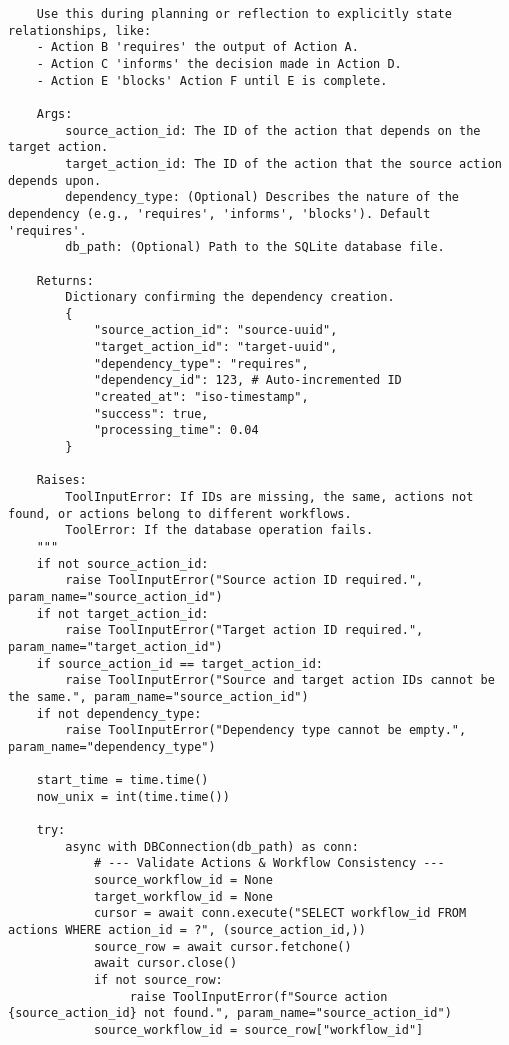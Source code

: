 \documentclass[12pt,a4paper]{article}
\begin{document}
\begin{pageablecode}
\begin{verbatim}
    Use this during planning or reflection to explicitly state relationships, like:
    - Action B 'requires' the output of Action A.
    - Action C 'informs' the decision made in Action D.
    - Action E 'blocks' Action F until E is complete.

    Args:
        source_action_id: The ID of the action that depends on the target action.
        target_action_id: The ID of the action that the source action depends upon.
        dependency_type: (Optional) Describes the nature of the dependency (e.g., 'requires', 'informs', 'blocks'). Default 'requires'.
        db_path: (Optional) Path to the SQLite database file.

    Returns:
        Dictionary confirming the dependency creation.
        {
            "source_action_id": "source-uuid",
            "target_action_id": "target-uuid",
            "dependency_type": "requires",
            "dependency_id": 123, # Auto-incremented ID
            "created_at": "iso-timestamp",
            "success": true,
            "processing_time": 0.04
        }

    Raises:
        ToolInputError: If IDs are missing, the same, actions not found, or actions belong to different workflows.
        ToolError: If the database operation fails.
    """
    if not source_action_id:
        raise ToolInputError("Source action ID required.", param_name="source_action_id")
    if not target_action_id:
        raise ToolInputError("Target action ID required.", param_name="target_action_id")
    if source_action_id == target_action_id:
        raise ToolInputError("Source and target action IDs cannot be the same.", param_name="source_action_id")
    if not dependency_type:
        raise ToolInputError("Dependency type cannot be empty.", param_name="dependency_type")

    start_time = time.time()
    now_unix = int(time.time()) 

    try:
        async with DBConnection(db_path) as conn:
            # --- Validate Actions & Workflow Consistency ---
            source_workflow_id = None
            target_workflow_id = None
            cursor = await conn.execute("SELECT workflow_id FROM actions WHERE action_id = ?", (source_action_id,))
            source_row = await cursor.fetchone()
            await cursor.close()
            if not source_row:
                 raise ToolInputError(f"Source action {source_action_id} not found.", param_name="source_action_id")
            source_workflow_id = source_row["workflow_id"]


\end{verbatim}
\end{pageablecode}
\end{document}
